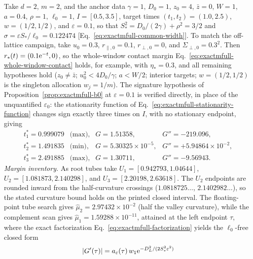 \begin{remark}
\label{rem:exactmfull-b0-anchor}
Take \(d=2\), \(m=2\), and the anchor data \(\gamma=1\), \(D_0=1\),
\(z_0=4\), \(\bar z=0\), \(W=1\), \(a=0.4\), \(\rho=1\), \(\ell_0=1\),
\(I=[0.5,3.5]\), target times \((t_1,t_2)=(1.0,2.5)\), \(w=(1/2,1/2)\), and
\(\varepsilon=0.1\), so that \(S_*^2=D_0/(2\gamma)+\rho^2=3/2\) and
\(\sigma=\varepsilon S_*/\ell_0=0.122474\)
[Eq.~\eqref{eq:exactmfull-common-width}].  To match the off-lattice campaign,
take
\(u_0=0.3\), \(r_{\parallel,0}=0.1\), \(r_{\perp,0}=0\), and
\(\Sigma_{\perp,0}=0.3^2\).  Then
\(r_*(t)=(0.1\mathrm e^{-t},0)\), so the whole-window contact margin
Eq.~\eqref{eq:exactmfull-whole-window-contact} holds, for example, with
\(\eta_*=0.3\), and all remaining hypotheses hold
(\(z_0\ne\bar z\); \(u_0^2<4D_0/\gamma\);
\(a<W/2\); interior targets; \(w=(1/2,1/2)\) is the singleton allocation
\(w_j=1/m\)).  The signature hypothesis of
Proposition~\ref{prop:exactmfull-b0} at \(\varepsilon=0.1\) is verified
directly, in place of the unquantified \(\varepsilon_0\): the stationarity
function of Eq.~\eqref{eq:exactmfull-stationarity-function} changes sign
exactly three times on \(I\), with no stationary endpoint, giving
\begin{equation}
 \begin{array}{llll}
 t_1^*=0.999079 &\text{(max)}, & G=1.51358, & G''=-219.096,\\
 t_2^*=1.491835 &\text{(min)}, & G=5.30325\times10^{-5}, &
   G''=+5.94864\times10^{-2},\\
 t_3^*=2.491885 &\text{(max)}, & G=1.30711, & G''=-9.56943.
 \end{array}
 \label{eq:exactmfull-b0-anchor-roots}
\end{equation}
\emph{Margin inventory.}  As root tubes take
\(U_1=[0.942793,1.04644]\), \(U_2=[1.081873,2.140298]\), and
\(U_3=[2.20198,2.63618]\).  The \(U_2\) endpoints are rounded inward from
the half-curvature crossings (\(1.0818725\ldots\), \(2.1402982\ldots\)), so
the stated curvature bound holds on the printed closed interval.  The
floating-point tube search gives
\(\widehat\mu_2=2.97432\times10^{-2}\) (half the valley curvature), while
the complement scan gives
\(\widehat\mu_1=1.59288\times10^{-11}\), attained at the left
endpoint \(\tau\), where the exact factorization
Eq.~\eqref{eq:exactmfull-factorization} yields the \(\ell_0\)-free closed
form
\begin{equation}
 |G'(\tau)|
 =a_\varepsilon(\tau)\,w_1
  \e^{-D_L^2/(2S_*^2\varepsilon^2)}

\end{equation}
\end{remark}
